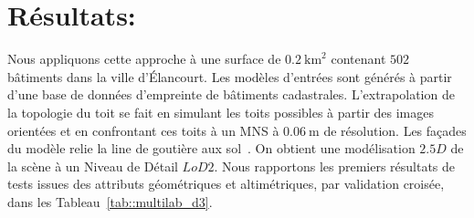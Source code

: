 \documentclass[a4paper,french]{article}
\begin{document}
    \section{Résultats:}

    Nous appliquons cette approche à une surface de $\SI{0.2}{\km \squared}$ contenant $502$ bâtiments dans la ville d'\'Elancourt. Les modèles d'entrées sont générés à partir d'une base de données d'empreinte de bâtiments cadastrales. L'extrapolation de la topologie du toit se fait en simulant les toits possibles à partir des images orientées et en  confrontant ces toits à un MNS à $\SI{0.06}{\m}$ de résolution. Les façades du modèle relie la line de goutière aux sol~\cite{Durupt2006}. On obtient une modélisation $2.5D$ de la scène à un Niveau de Détail $LoD 2$. Nous rapportons les premiers résultats de tests issues des attributs géométriques et altimétriques, par validation croisée, dans les Tableau~\ref{tab::multilab_d3}.
\end{document}
